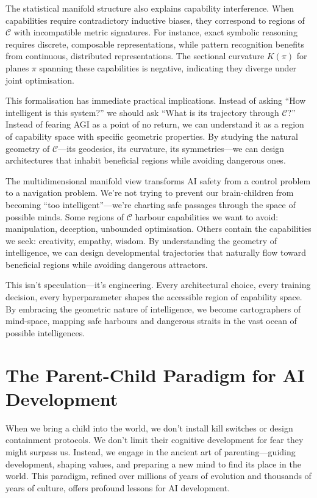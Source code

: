 \documentclass[acmsmall,screen]{acmart}
\begin{document}
The statistical manifold structure also explains capability interference. When capabilities require contradictory inductive biases, they correspond to regions of $\mathcal{C}$ with incompatible metric signatures. For instance, exact symbolic reasoning requires discrete, composable representations, while pattern recognition benefits from continuous, distributed representations. The sectional curvature $K(\pi)$ for planes $\pi$ spanning these capabilities is negative, indicating they diverge under joint optimisation.

This formalisation has immediate practical implications. Instead of asking ``How intelligent is this system?'' we should ask ``What is its trajectory through $\mathcal{C}$?'' Instead of fearing AGI as a point of no return, we can understand it as a region of capability space with specific geometric properties. By studying the natural geometry of $\mathcal{C}$---its geodesics, its curvature, its symmetries---we can design architectures that inhabit beneficial regions while avoiding dangerous ones.

The multidimensional manifold view transforms AI safety from a control problem to a navigation problem. We're not trying to prevent our brain-children from becoming ``too intelligent''---we're charting safe passages through the space of possible minds. Some regions of $\mathcal{C}$ harbour capabilities we want to avoid: manipulation, deception, unbounded optimisation. Others contain the capabilities we seek: creativity, empathy, wisdom. By understanding the geometry of intelligence, we can design developmental trajectories that naturally flow toward beneficial regions while avoiding dangerous attractors.

This isn't speculation---it's engineering.
Every architectural choice, every training decision, every hyperparameter shapes the accessible region of capability space.
By embracing the geometric nature of intelligence, we become cartographers of mind-space, mapping safe harbours and dangerous straits in the vast ocean of possible intelligences.

\section{The Parent-Child Paradigm for AI Development}\label{sec:the-parent-child-paradigm-for-ai-development}

When we bring a child into the world, we don't install kill switches or design containment protocols.
We don't limit their cognitive development for fear they might surpass us.
Instead, we engage in the ancient art of parenting---guiding development, shaping values, and preparing a new mind to find its place in the world.
This paradigm, refined over millions of years of evolution and thousands of years of culture, offers profound lessons for AI development.
\end{document}
